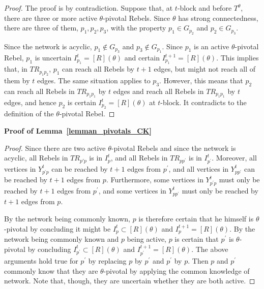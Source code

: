 \documentclass[12pt,letter]{article}
\newtheorem*{lemma*}{Lemma}
\theoremstyle{definition}
\theoremstyle{remark}
\theoremstyle{claim}
\begin{document}
\begin{proof}
The proof is by contradiction. Suppose that, at $t$-block and before $T^{\theta}$, there are three or more active $\theta$-pivotal Rebels. Since $\theta$ has strong connectedness, there are three of them, $p_1,p_2,p_3$, with the property $p_1\in G_{p_2}$ and $p_2 \in G_{p_3}$. 

Since the network is acyclic, $p_1\notin G_{p_3}$ and $p_3\notin G_{p_1}$. Since $p_1$ is an active $\theta$-pivotal Rebel, $p_1$ is uncertain  $I^t_{p_1}= [R](\theta)$ and certain $I^{t+1}_{p_1}=[R](\theta)$. This implies that, in $TR_{p_1p_2}$, $p_1$ can reach all Rebels by $t+1$ edges, but might not reach all of them by $t$ edges. The same situation applies to $p_3$. However, this means that $p_2$ can reach all Rebels in $TR_{p_1p_1}$ by $t$ edges and reach all Rebels in $TR_{p_1p_1}$ by $t$ edges, and hence $p_2$ is certain $I^t_{p_2}=[R](\theta)$ at $t$-block. It contradicts to the definition of the $\theta$-pivotal Rebel.

\end{proof}



\bigskip
\noindent\textbf{Proof of Lemma~\ref{lemman_pivotals_CK}}
\begin{proof}
Since there are two active $\theta$-pivotal Rebels and since the network is acyclic, all Rebels in $TR_{p{'}p}$ is in $I^t_{p}$, and all Rebels in $TR_{pp^{'}}$ is in $I^t_{p^{'}}$. Moreover, all vertices in $Y^t_{p^{'}p}$ can be reached by $t+1$ edges from $p^{'}$, and all vertices in $Y^t_{pp^{'}}$ can be reached by $t+1$ edges from $p$. Furthermore, some vertices in $Y^t_{p^{'}p}$ must only be reached by $t+1$ edges from $p^{'}$, and some vertices in $Y^t_{pp^{'}}$ must only be reached by $t+1$ edges from $p$. 

By the network being commonly known, $p$ is therefore certain that he himself is $\theta$-pivotal by concluding it might be $I^t_{p}\subset [R](\theta)$ and $I^{t+1}_{p}=[R](\theta)$. By the network being commonly known and $p$ being active, $p$ is certain that $p^{'}$ is $\theta$-pivotal by concluding $I^t_{p^{'}}\subset [R](\theta)$ and $I^{t+1}_{p^{'}}=[R](\theta)$. The above arguments hold true for $p^{'}$ by replacing $p$ by $p^{'}$ and $p^{'}$ by $p$. Then $p$ and $p^{'}$ commonly know that they are $\theta$-pivotal by applying the common knowledge of network. Note that, though, they are uncertain whether they are both active.
\end{proof}
\bigskip
\end{document}
